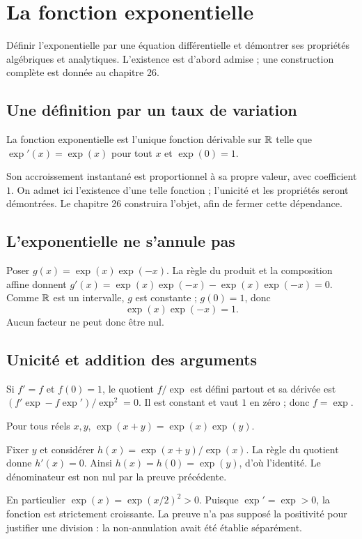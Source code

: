 \documentclass[../cours_1re.tex]{subfiles}
\begin{document}
\setcounter{chapter}{11}
\chapter{La fonction exponentielle}
\label{ch:12}
\begin{objectif}
Définir l'exponentielle par une équation différentielle et démontrer ses propriétés algébriques et analytiques. L'existence est d'abord admise ; une construction complète est donnée au chapitre 26.
\end{objectif}
\section{Une définition par un taux de variation}
\begin{definition}
La fonction exponentielle est l'unique fonction dérivable sur $\mathbb{R}$ telle que
$\exp'(x)=\exp(x)$ pour tout $x$ et $\exp(0)=1$.
\end{definition}
Son accroissement instantané est proportionnel à sa propre valeur, avec coefficient $1$. On admet ici l'existence d'une telle fonction ; l'unicité et les propriétés seront démontrées. Le chapitre 26 construira l'objet, afin de fermer cette dépendance.
\section{L'exponentielle ne s'annule pas}
\begin{demonstration}
Poser $g(x)=\exp(x)\exp(-x)$. La règle du produit et la composition affine donnent
$g'(x)=\exp(x)\exp(-x)-\exp(x)\exp(-x)=0$.
Comme $\mathbb{R}$ est un intervalle, $g$ est constante ; $g(0)=1$, donc
\[
\exp(x)\exp(-x)=1.
\]
Aucun facteur ne peut donc être nul.
\end{demonstration}
\section{Unicité et addition des arguments}
\begin{demonstration}[Unicité]
Si $f'=f$ et $f(0)=1$, le quotient $f/\exp$ est défini partout et sa dérivée est
$(f'\exp-f\exp')/\exp^2=0$. Il est constant et vaut $1$ en zéro ; donc $f=\exp$.
\end{demonstration}
\begin{theoreme}
Pour tous réels $x,y$,
$\exp(x+y)=\exp(x)\exp(y)$.
\end{theoreme}
\begin{demonstration}
Fixer $y$ et considérer $h(x)=\exp(x+y)/\exp(x)$.
La règle du quotient donne $h'(x)=0$. Ainsi $h(x)=h(0)=\exp(y)$, d'où l'identité.
Le dénominateur est non nul par la preuve précédente.
\end{demonstration}
En particulier $\exp(x)=\exp(x/2)^2>0$. Puisque $\exp'=\exp>0$, la fonction est strictement croissante.
La preuve n'a pas supposé la positivité pour justifier une division : la non-annulation avait été établie séparément.
\end{document}
